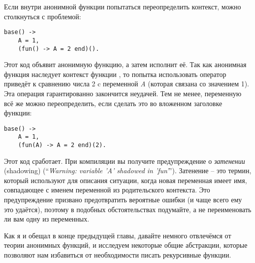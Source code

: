 Если внутри анонимной функции попытаться переопределить контекст, можно столкнуться с проблемой:
\begin{lstlisting}[style=erlang]
base() ->
    A = 1,
    (fun() -> A = 2 end)().
\end{lstlisting}

Этот код объявит анонимную функцию, а затем исполнит её.
Так как анонимная функция наследует контекст функции , то попытка использовать оператор \ops{=\strut} приведёт к сравнению числа 2 c переменной \emph{A} (которая связана со значением 1).
Эта операция гарантированно закончится неудачей.
Тем не менее, переменную всё же можно переопределить, если сделать это во вложенном заголовке функции:
\begin{lstlisting}[style=erlang]
base() ->
    A = 1,
    (fun(A) -> A = 2 end)(2).
\end{lstlisting}

Этот код сработает.
При компиляции вы получите предупреждение о \emph{затенении} (shadowing) (``\emph{Warning: variable 'A' shadowed in 'fun'}'').
Затенение \--- это термин, который используют для описания ситуации, когда новая переменная имеет имя, совпадающее с именем переменной из родительского контекста.
Это предупреждение призвано предотвратить вероятные ошибки (и чаще всего ему это удаётся), поэтому в подобных обстоятельствах подумайте, а не переименовать ли вам одну из переменных.

Как я и обещал в конце предыдущей главы, давайте немного отвлечёмся от теории анонимных функций, и исследуем некоторые общие абстракции, которые позволяют нам избавиться от необходимости писать рекурсивные функции.
